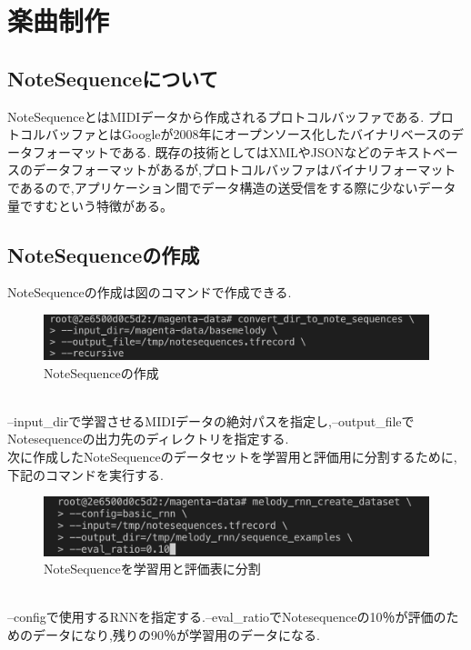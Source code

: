 \chapter{楽曲制作}
\section{NoteSequenceについて}
NoteSequenceとはMIDIデータから作成されるプロトコルバッファである.
プロトコルバッファとはGoogleが2008年にオープンソース化したバイナリベースのデータフォーマットである.
既存の技術としてはXMLやJSONなどのテキストベースのデータフォーマットがあるが,プロトコルバッファはバイナリフォーマットであるので,アプリケーション間でデータ構造の送受信をする際に少ないデータ量ですむという特徴がある。
\section{NoteSequenceの作成}
NoteSequenceの作成は図のコマンドで作成できる.
\begin{figure}[!ht]
    \begin{screen}
    \begin{center}
        \includegraphics[scale=0.7, clip]{./img/Notesequence_make.png}
        \caption{NoteSequenceの作成}
        \label{fig:NoteSequenceの作成}
    \end{center}
    \end{screen}
\end{figure}\\
--input\_dirで学習させるMIDIデータの絶対パスを指定し,--output\_fileでNotesequenceの出力先のディレクトリを指定する.\\
\newpage
次に作成したNoteSequenceのデータセットを学習用と評価用に分割するために,下記のコマンドを実行する.
\begin{figure}[!ht]
    \begin{screen}
    \begin{center}
        \includegraphics[scale=0.7, clip]{./img/Notesequence_split.png}
        \caption{NoteSequenceを学習用と評価表に分割}
        \label{fig:NoteSequenceを学習用と評価表に分割}
    \end{center}
    \end{screen}
\end{figure}\\
--configで使用するRNNを指定する.--eval\_ratioでNotesequenceの10％が評価のためのデータになり,残りの90％が学習用のデータになる.\\
